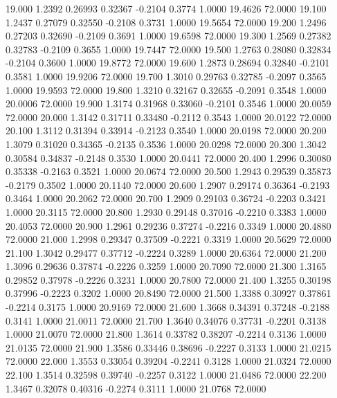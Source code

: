   19.000   1.2392   0.26993   0.32367  -0.2104   0.3774   1.0000  19.4626  72.0000
  19.100   1.2437   0.27079   0.32550  -0.2108   0.3731   1.0000  19.5654  72.0000
  19.200   1.2496   0.27203   0.32690  -0.2109   0.3691   1.0000  19.6598  72.0000
  19.300   1.2569   0.27382   0.32783  -0.2109   0.3655   1.0000  19.7447  72.0000
  19.500   1.2763   0.28080   0.32834  -0.2104   0.3600   1.0000  19.8772  72.0000
  19.600   1.2873   0.28694   0.32840  -0.2101   0.3581   1.0000  19.9206  72.0000
  19.700   1.3010   0.29763   0.32785  -0.2097   0.3565   1.0000  19.9593  72.0000
  19.800   1.3210   0.32167   0.32655  -0.2091   0.3548   1.0000  20.0006  72.0000
  19.900   1.3174   0.31968   0.33060  -0.2101   0.3546   1.0000  20.0059  72.0000
  20.000   1.3142   0.31711   0.33480  -0.2112   0.3543   1.0000  20.0122  72.0000
  20.100   1.3112   0.31394   0.33914  -0.2123   0.3540   1.0000  20.0198  72.0000
  20.200   1.3079   0.31020   0.34365  -0.2135   0.3536   1.0000  20.0298  72.0000
  20.300   1.3042   0.30584   0.34837  -0.2148   0.3530   1.0000  20.0441  72.0000
  20.400   1.2996   0.30080   0.35338  -0.2163   0.3521   1.0000  20.0674  72.0000
  20.500   1.2943   0.29539   0.35873  -0.2179   0.3502   1.0000  20.1140  72.0000
  20.600   1.2907   0.29174   0.36364  -0.2193   0.3464   1.0000  20.2062  72.0000
  20.700   1.2909   0.29103   0.36724  -0.2203   0.3421   1.0000  20.3115  72.0000
  20.800   1.2930   0.29148   0.37016  -0.2210   0.3383   1.0000  20.4053  72.0000
  20.900   1.2961   0.29236   0.37274  -0.2216   0.3349   1.0000  20.4880  72.0000
  21.000   1.2998   0.29347   0.37509  -0.2221   0.3319   1.0000  20.5629  72.0000
  21.100   1.3042   0.29477   0.37712  -0.2224   0.3289   1.0000  20.6364  72.0000
  21.200   1.3096   0.29636   0.37874  -0.2226   0.3259   1.0000  20.7090  72.0000
  21.300   1.3165   0.29852   0.37978  -0.2226   0.3231   1.0000  20.7800  72.0000
  21.400   1.3255   0.30198   0.37996  -0.2223   0.3202   1.0000  20.8490  72.0000
  21.500   1.3388   0.30927   0.37861  -0.2214   0.3175   1.0000  20.9169  72.0000
  21.600   1.3668   0.34391   0.37248  -0.2188   0.3141   1.0000  21.0011  72.0000
  21.700   1.3640   0.34076   0.37731  -0.2201   0.3138   1.0000  21.0070  72.0000
  21.800   1.3614   0.33782   0.38207  -0.2214   0.3136   1.0000  21.0135  72.0000
  21.900   1.3586   0.33446   0.38696  -0.2227   0.3133   1.0000  21.0215  72.0000
  22.000   1.3553   0.33054   0.39204  -0.2241   0.3128   1.0000  21.0324  72.0000
  22.100   1.3514   0.32598   0.39740  -0.2257   0.3122   1.0000  21.0486  72.0000
  22.200   1.3467   0.32078   0.40316  -0.2274   0.3111   1.0000  21.0768  72.0000
